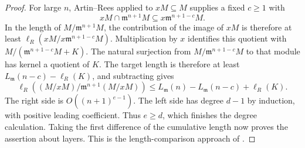 \documentclass[11pt,oneside,openany]{book}
\theoremstyle{definition}
\theoremstyle{remark}
\begin{document}
\begin{proof}
For large \(n\), Artin--Rees applied to \(xM\subseteq M\) supplies a fixed \(c\ge1\) with
\[
 xM\cap\mathfrak m^{n+1}M\subseteq x\mathfrak m^{n+1-c}M .
\]
In the length of \(M/\mathfrak m^{n+1}M\), the contribution of the image of \(xM\) is therefore at least \(\ell_R(xM/x\mathfrak m^{n+1-c}M)\). Multiplication by \(x\) identifies this quotient with
\(M/(\mathfrak m^{n+1-c}M+K)\). The natural surjection from
\(M/\mathfrak m^{n+1-c}M\) to that module has kernel a quotient
of \(K\). The target length is therefore at least
\(L_{\mathfrak m}(n-c)-\ell_R(K)\), and subtracting gives
\[
 \ell_R\!\left((M/xM)/\mathfrak m^{n+1}(M/xM)\right)
 \le L_{\mathfrak m}(n)-L_{\mathfrak m}(n-c)+\ell_R(K).
\]
The right side is \(O((n+1)^{e-1})\). The left side has degree \(d-1\) by induction, with positive leading coefficient. Thus \(e\ge d\), which finishes the degree calculation. Taking the first difference of the cumulative length now proves the assertion about layers. This is the length-comparison approach of \cite[Chapter 12, especially Theorem 12.4]{eisenbud}.
\end{proof}
\end{document}
